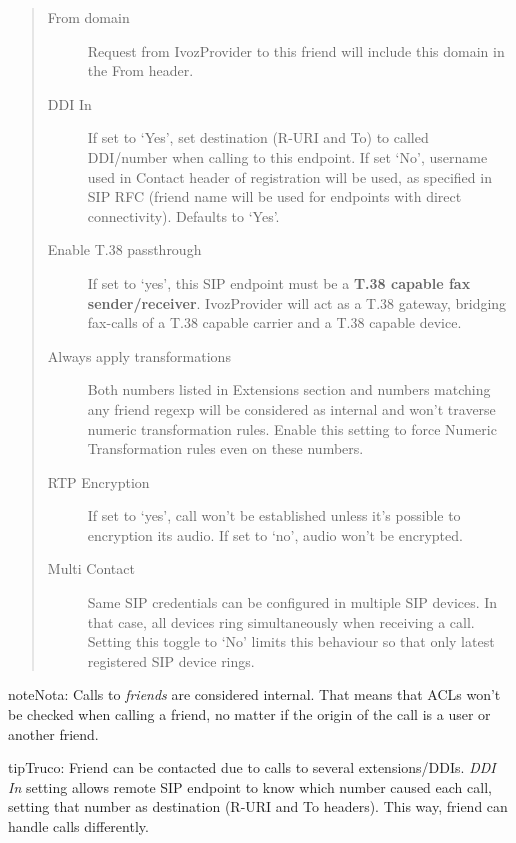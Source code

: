 \documentclass[letterpaper,10pt,spanish]{sphinxmanual}
\begin{document}
\begin{quote}
\begin{description}
\item[{From domain}] \leavevmode
Request from IvozProvider to this friend will include this domain in
the From header.

\item[{DDI In}] \leavevmode
If set to `Yes', set destination (R-URI and To) to called DDI/number when calling to this endpoint. If set `No', username
used in Contact header of registration will be used, as specified in SIP RFC (friend name will be used for
endpoints with direct connectivity). Defaults to `Yes'.

\item[{Enable T.38 passthrough}] \leavevmode
If set to `yes', this SIP endpoint must be a \textbf{T.38 capable fax sender/receiver}. IvozProvider
will act as a T.38 gateway, bridging fax-calls of a T.38 capable carrier and a T.38 capable device.

\item[{Always apply transformations}] \leavevmode
Both numbers listed in Extensions section and numbers matching any friend regexp will be considered as internal and
won't traverse numeric transformation rules.  Enable this setting to force Numeric Transformation rules even on these numbers.

\item[{RTP Encryption}] \leavevmode
If set to `yes', call won't be established unless it's possible to encryption its audio. If set to `no',
audio won't be encrypted.

\item[{Multi Contact}] \leavevmode
Same SIP credentials can be configured in multiple SIP devices. In that case, all devices ring
simultaneously when receiving a call. Setting this toggle to `No' limits this behaviour so that
only latest registered SIP device rings.

\end{description}
\end{quote}

\begin{notice}{note}{Nota:}
Calls to \emph{friends} are considered internal. That means that ACLs won't
be checked when calling a friend, no matter if the origin of the call
is a user or another friend.
\end{notice}

\begin{notice}{tip}{Truco:}
Friend can be contacted due to calls to several extensions/DDIs. \emph{DDI In} setting allows remote SIP endpoint to
know which number caused each call, setting that number as destination (R-URI and To headers). This way, friend
can handle calls differently.
\end{notice}
\end{document}
